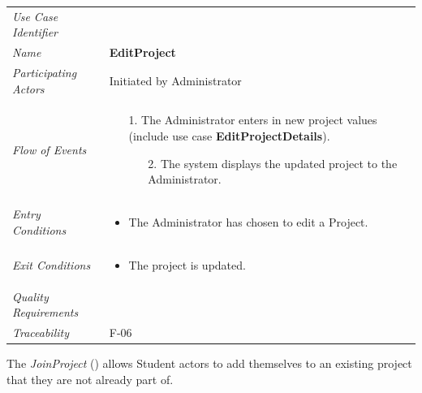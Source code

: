 \documentclass[12pt,letterpaper]{article}
\begin{document}
\begin{center}
	\begin{tabu} to 
		\toprule
		Use Case Identifier &  \\
		Name & {\bf EditProject} \\
		Participating Actors & Initiated by Administrator \\
		Flow of Events & 
		\begin{minipage}[t]{\linewidth}
		    \begin{enumerate}
		        \item[1.] The Administrator enters in new project values (include use case \textbf{EditProjectDetails}).
			    \begin{enumerate}
			        \item[2.] The system displays the updated project to the Administrator.
			    \end{enumerate}
			\end{enumerate}
		\end{minipage} \\

		Entry Conditions &
		\begin{minipage}[t]{\linewidth}
			\begin{itemize}
			    \item The Administrator has chosen to edit a Project.
	        \end{itemize}
		\end{minipage} \\

		Exit Conditions &
        \begin{minipage}[t]{\linewidth}
			\begin{itemize}
			    \item The project is updated.
	        \end{itemize}
		\end{minipage} \\

		Quality Requirements & \\

		Traceability & F-06 \\
		\toprule
	\end{tabu}
\end{center}

\newpage{}

The {\it JoinProject} () allows Student actors to add themselves to an existing project that they are not already part of.
\end{document}

